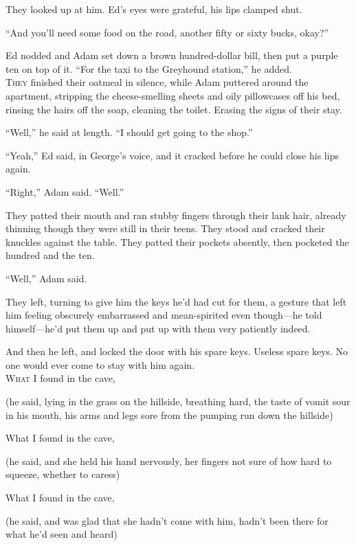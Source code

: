 They looked up at him.  Ed's eyes were grateful, his lips clamped
shut.

``And you'll need some food on the road, another fifty or sixty bucks,
okay?''

Ed nodded and Adam set down a brown hundred-dollar bill, then put a
purple ten on top of it.  ``For the taxi to the Greyhound station,''
he added.
\\
\lettrine[lines=3, lhang=.5, nindent=0pt, findent=2pt]{T}{hey} finished their oatmeal in silence, while Adam puttered around the
apartment, stripping the cheese-smelling sheets and oily pillowcases
off his bed, rinsing the hairs off the soap, cleaning the toilet. 
Erasing the signs of their stay.

``Well,'' he said at length.  ``I should get going to the shop.''

``Yeah,'' Ed said, in George's voice, and it cracked before he could
close his lips again.

``Right,'' Adam said.  ``Well.''

They patted their mouth and ran stubby fingers through their lank
hair, already thinning though they were still in their teens.  They
stood and cracked their knuckles against the table.  They patted their
pockets absently, then pocketed the hundred and the ten.

``Well,'' Adam said.

They left, turning to give him the keys he'd had cut for them, a
gesture that left him feeling obscurely embarrassed and mean-spirited
even though---he told himself---he'd put them up and put up with them
very patiently indeed.

And then he left, and locked the door with his spare keys.  Useless
spare keys.  No one would ever come to stay with him again.
\\
\lettrine[lines=3, lhang=.5, nindent=0pt, findent=2pt]{W}{hat} I found in the cave,

(he said, lying in the grass on the hillside, breathing hard, the
taste of vomit sour in his mouth, his arms and legs sore from the
pumping run down the hillside)

What I found in the cave,

(he said, and she held his hand nervously, her fingers not sure of how
hard to squeeze, whether to caress)

What I found in the cave,

(he said, and was glad that she hadn't come with him, hadn't been
there for what he'd seen and heard)


